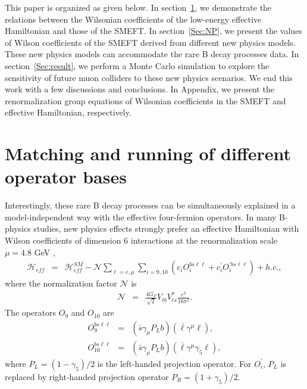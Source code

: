 \documentclass[a4paper,11pt]{article}
\begin{document}
This paper is organized as given below. 
In section~\ref{Sec:EFT}, we demonstrate the relations between the Wilsonian coefficients of the low-energy effective Hamiltonian and those of the SMEFT. 
In section~\ref{Sec:NP}, we present the values of Wilson coefficients of the SMEFT derived from different new physics models. 
These new physics models can accommodate the rare B decay processes data. 
In section~\ref{Sec:result}, we perform a Monte Carlo simulation to explore the sensitivity of future muon colliders to these new physics scenarios. 
We end this work with a few discussions and conclusions. 
In Appendix, we present the renormalization group equations of Wilsonian coefficients in the SMEFT and effective Hamiltonian, respectively. 

\section{Matching and running of different operator bases}
\label{Sec:EFT}

Interestingly, these rare B decay processes can be simultaneously explained in a model-independent way with the effective four-fermion operators. 
In many B-physics studies, new physics effects strongly prefer an effective Hamiltonian 
with Wilson coefficients of dimension 6 interactions at the renormalization scale $\mu =4.8$ GeV ,
\begin{eqnarray}
  \mathcal{H}_{eff} &=& \mathcal{H}^{SM}_{eff}-\mathcal{N}\sum_{\ell=e,\mu}\sum_{i=9,10}\left(c_iO^{bs\ell\ell}_i+c^\prime_i O^{\prime bs\ell\ell}_i\right) + h.c., 
\end{eqnarray} 
where the normalization factor $\mathcal{N}$ is 
\begin{eqnarray}
  \mathcal{N} &=& \frac{4G_F}{\sqrt{2}}V_{tb}V^*_{ts}\frac{e^2}{16\pi^2}. 
\end{eqnarray}
The operators $O_9$ and $O_{10}$ are 
\begin{eqnarray}
   O^{bs\ell\ell}_9 &=& (\bar{s}\gamma_\mu P_L b)(\bar{\ell}\gamma^{\mu}\ell),  \\
   O^{bs\ell\ell}_{10} &=& (\bar{s}\gamma_\mu P_L b)(\bar{\ell}\gamma^{\mu}\gamma_5\ell),
\end{eqnarray}
where $P_L=(1-\gamma_5)/2$ is the left-handed projection operator. 
For $O^\prime_i$, $P_L$ is replaced by right-handed projection operator $P_R=(1+\gamma_5)/2$.
\end{document}
